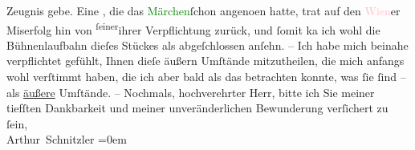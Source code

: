                     Zeugnis gebe. Eine \label{K_L00336_3v}\label{K_L00336_3h}, die das \textcolor{green}{Märchen}{}\ledrightnote{\textcolor{green}{Das Märchen. Schauspiel in drei Aufzügen}}{ }ſchon angeno{\geminationm}en hatte, trat
                    auf den \textcolor{pink}{Wien}{}\ledrightnote{\textcolor{pink}{Wien}}er Miserfolg hin von \substVorne{}\textsuperscript{ſeiner}{\allowbreak}\substDazwischen{}ihrer\substHinten{} Verpflichtung zurück, und ſomit ka{\geminationn} ich
                    wohl die Bühnenlaufbahn dieſes Stückes als abgeſchlossen anſehn. – Ich {\pb}habe mich beinahe verpflichtet gefühlt,
                    Ihnen dieſe äußern Umſtände mitzutheilen, die mich anfangs wohl verſtimmt haben,
                    die ich aber bald als das betrachten konnte, was ſie ſind – als \uline{äußere} Umſtände. –\pend
           \pstart
           Nochmals, hochverehrter Herr, bitte ich Sie meiner tiefſten Dankbarkeit und
                    meiner unveränderlichen Bewunderung verſichert zu ſein,{\\[\baselineskip]}\spacefill\mbox{Arthur Schnitzler}\pend
           \leftskip=0em{}\endnumbering{}  
      